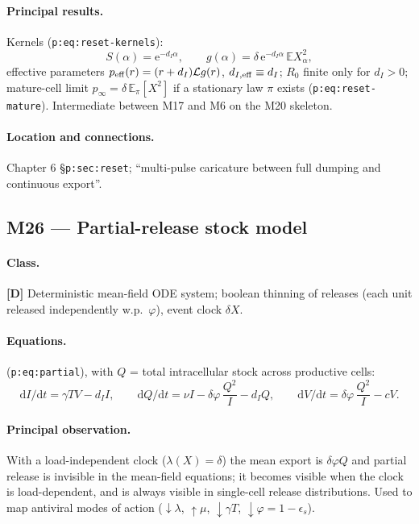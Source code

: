 \documentclass[11pt,a4paper]{article}
\newcommand{\EX}{\mathbb{E}}
\newcommand{\ee}{\mathrm{e}}
\newcommand{\dd}{\mathrm{d}}
\newcommand{\Lap}{\mathcal{L}}      %
\begin{document}
\paragraph{Principal results.} Kernels (\texttt{p:eq:reset-kernels}):
\[
S(\alpha)=\ee^{-d_I\alpha},\qquad
g(\alpha)=\delta\,\ee^{-d_I\alpha}\,\EX{X_\alpha^2},
\]
effective parameters $p_{\rm eff}(r)=(r+d_I)\Lap g(r)$, $d_{I,\rm eff}
\equiv d_I$; $R_0$ finite only for $d_I>0$; mature-cell limit
$p_\infty=\delta\,\EX_\pi[X^2]$ if a stationary law $\pi$ exists
(\texttt{p:eq:reset-mature}). Intermediate between M17 and M6 on the M20
skeleton.

\paragraph{Location and connections.} Chapter 6 \S\texttt{p:sec:reset};
``multi-pulse caricature between full dumping and continuous export''.

\subsection{M26 --- Partial-release stock model }

\paragraph{Class.} \textbf{[D]} Deterministic mean-field ODE system;
boolean thinning of releases (each unit released independently w.p.\
$\varphi$), event clock $\delta X$.

\paragraph{Equations.} (\texttt{p:eq:partial}), with $Q$ = total
intracellular stock across productive cells:
\[
\dd I/\dd t=\gamma TV-d_II,\qquad
\dd Q/\dd t=\nu I-\delta\varphi\,\frac{Q^2}{I}-d_IQ,\qquad
\dd V/\dd t=\delta\varphi\,\frac{Q^2}{I}-cV .
\]

\paragraph{Principal observation.} With a load-independent clock
($\lambda(X)=\delta$) the mean export is $\delta\varphi Q$ and partial
release is invisible in the mean-field equations; it becomes visible when
the clock is load-dependent, and is always visible in single-cell release
distributions. Used to map antiviral modes of action
($\downarrow\lambda$, $\uparrow\mu$, $\downarrow\gamma T$, $\downarrow
\varphi=1-\epsilon_s$).
\end{document}
